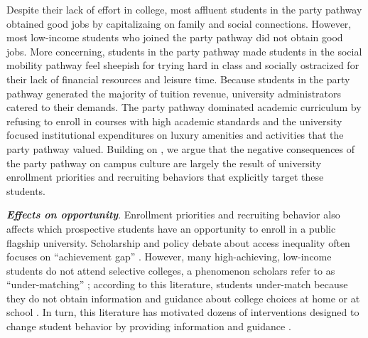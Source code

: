 \documentclass[twoside]{article}
\begin{document}
Despite their lack of effort in college, most affluent students in the party pathway obtained good jobs by capitalizaing on family and social connections. However, most low-income students who joined the party pathway did not obtain good jobs. More concerning, students in the party pathway made students in the social mobility pathway feel sheepish for trying hard in class and socially ostracized for their lack of financial resources and leisure time.  Because students in the party pathway generated the majority of tuition revenue, university administrators catered to their demands. The party pathway dominated academic curriculum by refusing to enroll in courses with high academic standards and the university focused institutional expenditures on luxury amenities and activities that the party pathway valued.  Building on \cite{RN4231}, we argue that the negative consequences of the party pathway on campus culture are largely the result of university enrollment priorities and recruiting behaviors that explicitly target these students.

\textbf{\textit{Effects on opportunity}}.  Enrollment priorities and recruiting behavior also affects which prospective students have an opportunity to enroll in a public flagship university.  Scholarship and policy debate about access inequality often focuses on ``achievement gap'' \citep{RN4016}.  However, many high-achieving, low-income students do not attend selective colleges, a phenomenon scholars refer to as ``under-matching'' \citep{RN3699,RN3700}; according to this literature, students under-match because they do not obtain information and guidance about college choices at home or at school \citep{RN4016}. In turn, this literature has motivated dozens of interventions designed to change student behavior by providing information and guidance \citep[e.g., ][]{RN4352,RN4345,RN4351}.

\end{document}
